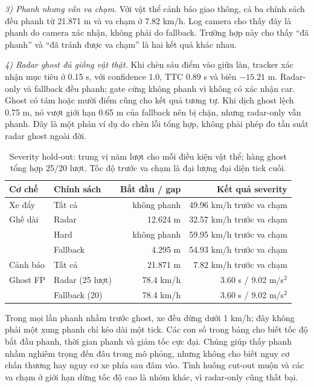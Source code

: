 \documentclass[conference]{IEEEtran}
\begin{document}
\emph{3) Phanh nhưng vẫn va chạm.} Với vật thể cảnh báo giao thông, cả ba
chính sách đều phanh từ 21.871 m và va chạm ở 7.82 km/h. Log camera cho thấy
đây là phanh do camera xác nhận, không phải do fallback. Trường hợp này cho
thấy ``đã phanh'' và ``đã tránh được va chạm'' là hai kết quả khác nhau.

\emph{4) Radar ghost đủ giống vật thật.} Khi chèn sáu điểm vào giữa làn,
tracker xác nhận mục tiêu ở 0.15 s, với confidence 1.0, TTC 0.89 s và biên
$-15.21$ m. Radar-only và fallback đều phanh; gate cứng không phanh vì không
có xác nhận car. Ghost có tám hoặc mười điểm cũng cho kết quả tương tự. Khi
dịch ghost lệch 0.75 m, nó vượt giới hạn 0.65 m của fallback nên bị chặn,
nhưng radar-only vẫn phanh. Đây là một phản ví dụ do chèn lỗi tổng hợp, không
phải phép đo tần suất radar ghost ngoài đời.

\begin{table}[t]
\caption{Severity hold-out: trung vị năm lượt cho mỗi điều kiện vật thể; hàng ghost tổng hợp 25/20 lượt. Tốc độ trước va chạm là đại lượng đại diện tick cuối.}
\label{tab:severity}
\centering\scriptsize
\setlength{\tabcolsep}{3pt}
\begin{tabular}{llrr}
\toprule Cơ chế & Chính sách & Bắt đầu / gap & Kết quả severity\\ \midrule
Xe đẩy & Tất cả & không phanh & 49.96 km/h trước va chạm\\
Ghế dài & Radar & 12.624 m & 32.57 km/h trước va chạm\\
 & Hard & không phanh & 59.95 km/h trước va chạm\\
 & Fallback & 4.295 m & 54.93 km/h trước va chạm\\
Cảnh báo & Tất cả & 21.871 m & 7.82 km/h trước va chạm\\
\midrule
Ghost FP & Radar (25 lượt) & 78.4 km/h & 3.60 s / 9.02 m/s$^2$\\
 & Fallback (20) & 78.4 km/h & 3.60 s / 9.02 m/s$^2$\\
\bottomrule
\end{tabular}
\end{table}

Trong mọi lần phanh nhầm trước ghost, xe đều dừng dưới 1 km/h; đây không phải
một xung phanh chỉ kéo dài một tick. Các con số trong bảng cho biết tốc độ bắt
đầu phanh, thời gian phanh và giảm tốc cực đại. Chúng giúp thấy phanh nhầm
nghiêm trọng đến đâu trong mô phỏng, nhưng không cho biết nguy cơ chấn thương
hay nguy cơ xe phía sau đâm vào. Tình huống cut-out muộn và các va chạm ở giới
hạn dừng tốc độ cao là nhóm khác, vì radar-only cũng thất bại.
\end{document}
